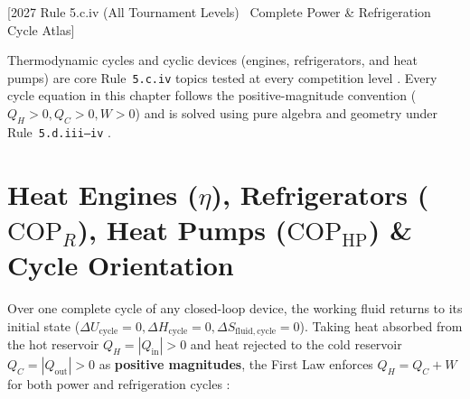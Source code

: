 [2027 Rule 5.c.iv (All Tournament Levels) \textbar\ Complete Power \& Refrigeration Cycle Atlas]


Thermodynamic cycles and cyclic devices (engines, refrigerators, and heat pumps) are core Rule~\texttt{5.c.iv} topics tested at every competition level . Every cycle equation in this chapter follows the positive-magnitude convention ($Q_H > 0, Q_C > 0, W > 0$) and is solved using pure algebra and geometry under Rule~\texttt{5.d.iii--iv} .

\section{Heat Engines ($\eta$), Refrigerators ($\mathrm{COP}_R$), Heat Pumps ($\mathrm{COP}_{\mathrm{HP}}$) \& Cycle Orientation}\label{sec:09.1}

Over one complete cycle of any closed-loop device, the working fluid returns to its initial state ($\Delta U_{\mathrm{cycle}} = 0, \Delta H_{\mathrm{cycle}} = 0, \Delta S_{\mathrm{fluid,cycle}} = 0$). Taking heat absorbed from the hot reservoir $Q_H = |Q_{\mathrm{in}}| > 0$ and heat rejected to the cold reservoir $Q_C = |Q_{\mathrm{out}}| > 0$ as \textbf{positive magnitudes}, the First Law enforces $\boxed{Q_H = Q_C + W}$ for both power and refrigeration cycles :

